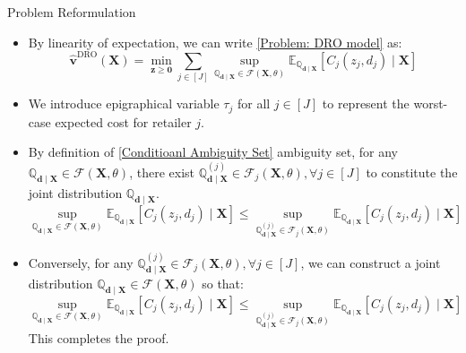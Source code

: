 \documentclass{beamer}
\newcommand{\mb}[1]{{\mathbf{#1}}}
\newcommand{\bbq}{\mathbb{Q}}
\begin{document}
\begin{frame}{Problem Reformulation}

\begin{itemize}
    \item By linearity of expectation, we can write \eqref{Problem: DRO model} as:
    \[
    \hat{\bm v}^{\text{DRO}}({\mb X})  = \min_{\bm z \geq \bm 0} \sum_{j \in [J]} \sup_{\bbq_{\bm d \mid \mb X} \in \mathcal{F}(\mb X, \theta)}  \mathbb{E}_{\bbq_{\bm d \mid \mb X}} \left[  C_j (z_j,  d_j)  \mid \mb X \right] 
    \]
    \item We introduce epigraphical variable $\tau_j$ for all $j \in [J]$ to represent the worst-case expected cost for retailer $j$.
    \item  By definition of \eqref{Conditioanl Ambiguity Set} ambiguity set, for any $\bbq_{\bm d \mid \mb X} \in \mathcal{F}(\mb X, \theta)$, there exist $\bbq^{(j)}_{\bm d \mid \mb X} \in \mathcal{F}_j(\mb X, \theta) ,\forall j\in [J]$ to constitute the joint distribution $\bbq_{\bm d \mid \mb X} $.
    \[
    \sup_{\bbq_{\bm d \mid \mb X} \in \mathcal{F}(\mb X, \theta)}  \mathbb{E}_{\bbq_{\bm d \mid \mb X}} \left[ C_j (z_j,  d_j)  \mid \mb X \right] \leq \sup_{\bbq^{(j)}_{\bm d \mid \mb X} \in \mathcal{F}_j(\mb X, \theta)}  \mathbb{E}_{\bbq_{\bm d \mid \mb X}} \left[ C_j (z_j,  d_j)  \mid \mb X \right]
    \]
    \item Conversely, for any $\bbq^{(j)}_{\bm d \mid \mb X} \in \mathcal{F}_j(\mb X, \theta), \forall j\in [J]$, we can construct a joint distribution $\bbq_{\bm d \mid \mb X} \in \mathcal{F}(\mb X, \theta)$ so that:
    \[
    \sup_{\bbq_{\bm d \mid \mb X} \in \mathcal{F}(\mb X, \theta)}  \mathbb{E}_{\bbq_{\bm d \mid \mb X}} \left[ C_j (z_j,  d_j)  \mid \mb X \right] \leq \sup_{\bbq^{(j)}_{\bm d \mid \mb X} \in \mathcal{F}_j(\mb X, \theta)}  \mathbb{E}_{\bbq_{\bm d \mid \mb X}} \left[ C_j (z_j,  d_j)  \mid \mb X \right]
    \]
    This completes the proof.
\end{itemize}


\end{frame}
\end{document}
